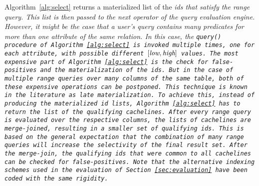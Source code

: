 Algorithm~\ref{alg:select} returns a materialized list of the \it{id}s that
satisfy the range query. This list is then passed to the next operator of the
query evaluation engine. However, it might be the case that a user's query
contains many predicates for more than one attribute of the same relation. In
this case, the \tt{query()} procedure of Algorithm~\ref{alg:select} is invoked
multiple times, one for each attribute, with possible different
$[\it{low},\it{high}]$ values. The most expensive part of
Algorithm~\ref{alg:select} is the check for false-positives and the
materialization of the \it{id}s. But in the case of multiple range queries over
many columns of the same table, both of these expensive operations can be
postponed. This technique is known in the literature as late materialization.
To achieve this, instead of producing the materialized \it{id} lists,
Algorithm~\ref{alg:select} has to return the list of the qualifying cachelines.
After every range query is evaluated over the respective columns, the lists of
cachelines are merge-joined, resulting in a smaller set of qualifying
\it{id}s. This is based on the general expectation that the combination of many
range queries will increase the selectivity of the final result set. After the
merge-join, the qualifying \it{id}s that were common to all cachelines can be
checked for false-positives. Note that the alternative indexing schemes used
in the evaluation of Section~\ref{sec:evaluation} have been coded with the same
rigidity.
